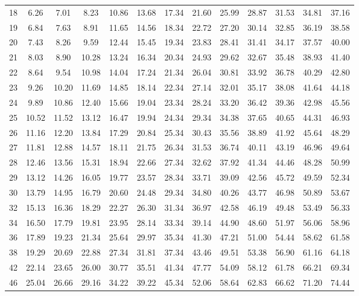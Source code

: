 \begin{center}
\begin{tabular}{c | c c c c c c c c c c c c}
18 & 6.26 & 7.01 & 8.23 & 10.86 & 13.68 & 17.34 & 21.60 & 25.99 & 28.87 & 31.53 & 34.81 & 37.16 \\
19 & 6.84 & 7.63 & 8.91 & 11.65 & 14.56 & 18.34 & 22.72 & 27.20 & 30.14 & 32.85 & 36.19 & 38.58 \\
20 & 7.43 & 8.26 & 9.59 & 12.44 & 15.45 & 19.34 & 23.83 & 28.41 & 31.41 & 34.17 & 37.57 & 40.00 \\
21 & 8.03 & 8.90 & 10.28 & 13.24 & 16.34 & 20.34 & 24.93 & 29.62 & 32.67 & 35.48 & 38.93 & 41.40 \\
22 & 8.64 & 9.54 & 10.98 & 14.04 & 17.24 & 21.34 & 26.04 & 30.81 & 33.92 & 36.78 & 40.29 & 42.80 \\
23 & 9.26 & 10.20 & 11.69 & 14.85 & 18.14 & 22.34 & 27.14 & 32.01 & 35.17 & 38.08 & 41.64 & 44.18 \\
24 & 9.89 & 10.86 & 12.40 & 15.66 & 19.04 & 23.34 & 28.24 & 33.20 & 36.42 & 39.36 & 42.98 & 45.56 \\
25 & 10.52 & 11.52 & 13.12 & 16.47 & 19.94 & 24.34 & 29.34 & 34.38 & 37.65 & 40.65 & 44.31 & 46.93 \\
26 & 11.16 & 12.20 & 13.84 & 17.29 & 20.84 & 25.34 & 30.43 & 35.56 & 38.89 & 41.92 & 45.64 & 48.29 \\
27 & 11.81 & 12.88 & 14.57 & 18.11 & 21.75 & 26.34 & 31.53 & 36.74 & 40.11 & 43.19 & 46.96 & 49.64 \\
28 & 12.46 & 13.56 & 15.31 & 18.94 & 22.66 & 27.34 & 32.62 & 37.92 & 41.34 & 44.46 & 48.28 & 50.99 \\
29 & 13.12 & 14.26 & 16.05 & 19.77 & 23.57 & 28.34 & 33.71 & 39.09 & 42.56 & 45.72 & 49.59 & 52.34 \\
30 & 13.79 & 14.95 & 16.79 & 20.60 & 24.48 & 29.34 & 34.80 & 40.26 & 43.77 & 46.98 & 50.89 & 53.67 \\
32 & 15.13 & 16.36 & 18.29 & 22.27 & 26.30 & 31.34 & 36.97 & 42.58 & 46.19 & 49.48 & 53.49 & 56.33 \\
34 & 16.50 & 17.79 & 19.81 & 23.95 & 28.14 & 33.34 & 39.14 & 44.90 & 48.60 & 51.97 & 56.06 & 58.96 \\
36 & 17.89 & 19.23 & 21.34 & 25.64 & 29.97 & 35.34 & 41.30 & 47.21 & 51.00 & 54.44 & 58.62 & 61.58 \\
38 & 19.29 & 20.69 & 22.88 & 27.34 & 31.81 & 37.34 & 43.46 & 49.51 & 53.38 & 56.90 & 61.16 & 64.18 \\
42 & 22.14 & 23.65 & 26.00 & 30.77 & 35.51 & 41.34 & 47.77 & 54.09 & 58.12 & 61.78 & 66.21 & 69.34 \\
46 & 25.04 & 26.66 & 29.16 & 34.22 & 39.22 & 45.34 & 52.06 & 58.64 & 62.83 & 66.62 & 71.20 & 74.44 \\

\end{tabular}
\end{center}
